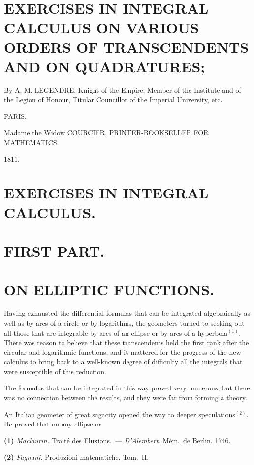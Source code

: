 \documentclass{article}
\begin{document}

\section*{EXERCISES IN INTEGRAL CALCULUS ON VARIOUS ORDERS OF TRANSCENDENTS AND ON QUADRATURES;}

By A. M. LEGENDRE, Knight of the Empire, Member of the Institute and of the Legion of Honour, Titular Councillor of the Imperial University, etc.

PARIS,

Madame the Widow COURCIER, PRINTER-BOOKSELLER FOR MATHEMATICS.

1811.


\section*{EXERCISES IN INTEGRAL CALCULUS.}

\section*{FIRST PART.}

\section*{ON ELLIPTIC FUNCTIONS.}

Having exhausted the differential formulas that can be integrated algebraically as well as by arcs of a circle or by logarithms, the geometers turned to seeking out all those that are integrable by arcs of an ellipse or by arcs of a hyperbola${}^{(1)}$. There was reason to believe that these transcendents held the first rank after the circular and logarithmic functions, and it mattered for the progress of the new calculus to bring back to a well-known degree of difficulty all the integrals that were susceptible of this reduction.

The formulas that can be integrated in this way proved very numerous; but there was no connection between the results, and they were far from forming a theory.

An Italian geometer of great sagacity opened the way to deeper speculations${}^{(2)}$. He proved that on any ellipse or

\textbf{(1)} \emph{Maclaurin.} Traité des Fluxions.~--- \emph{D'Alembert.} Mém.\ de Berlin. 1746.

\textbf{(2)} \emph{Fagnani.} Produzioni matematiche, Tom.\ II.
\end{document}
